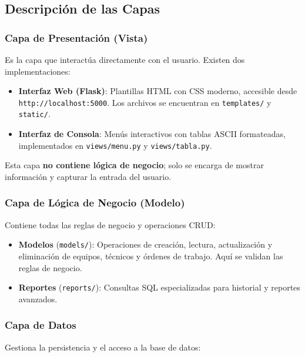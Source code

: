 \documentclass[12pt, a4paper]{article}
\begin{document}
\subsection{Descripción de las Capas}

\subsubsection{Capa de Presentación (Vista)}

Es la capa que interactúa directamente con el usuario. Existen dos implementaciones:

\begin{itemize}[leftmargin=2em]
    \item \textbf{Interfaz Web (Flask)}: Plantillas HTML con CSS moderno, accesible desde \texttt{http://localhost:5000}. Los archivos se encuentran en \texttt{templates/} y \texttt{static/}.
    \item \textbf{Interfaz de Consola}: Menús interactivos con tablas ASCII formateadas, implementados en \texttt{views/menu.py} y \texttt{views/tabla.py}.
\end{itemize}

Esta capa \textbf{no contiene lógica de negocio}; solo se encarga de mostrar información y capturar la entrada del usuario.

\subsubsection{Capa de Lógica de Negocio (Modelo)}

Contiene todas las reglas de negocio y operaciones CRUD:

\begin{itemize}[leftmargin=2em]
    \item \textbf{Modelos} (\texttt{models/}): Operaciones de creación, lectura, actualización y eliminación de equipos, técnicos y órdenes de trabajo. Aquí se validan las reglas de negocio.
    \item \textbf{Reportes} (\texttt{reports/}): Consultas SQL especializadas para historial y reportes avanzados.
\end{itemize}

\subsubsection{Capa de Datos}

Gestiona la persistencia y el acceso a la base de datos:
\end{document}
